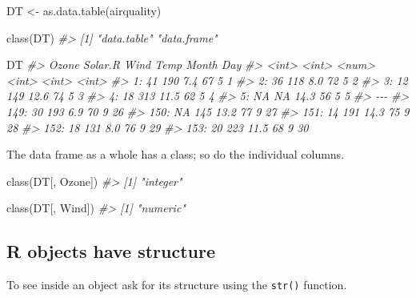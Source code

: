 \documentclass[
]{book}
\newenvironment{Shaded}{\begin{snugshade}}{\end{snugshade}}
\newcommand{\CommentTok}[1]{\textcolor[rgb]{0.56,0.35,0.01}{\textit{#1}}}
\newcommand{\FunctionTok}[1]{\textcolor[rgb]{0.00,0.00,0.00}{#1}}
\newcommand{\NormalTok}[1]{#1}
\newcommand{\OtherTok}[1]{\textcolor[rgb]{0.56,0.35,0.01}{#1}}
\begin{document}
\begin{Shaded}
\begin{Highlighting}[]
\NormalTok{DT }\OtherTok{\textless{}{-}} \FunctionTok{as.data.table}\NormalTok{(airquality)}

\FunctionTok{class}\NormalTok{(DT)}
\CommentTok{\#\textgreater{} [1] "data.table" "data.frame"}

\NormalTok{DT}
\CommentTok{\#\textgreater{}      Ozone Solar.R  Wind  Temp Month   Day}
\CommentTok{\#\textgreater{}      \textless{}int\textgreater{}   \textless{}int\textgreater{} \textless{}num\textgreater{} \textless{}int\textgreater{} \textless{}int\textgreater{} \textless{}int\textgreater{}}
\CommentTok{\#\textgreater{}   1:    41     190   7.4    67     5     1}
\CommentTok{\#\textgreater{}   2:    36     118   8.0    72     5     2}
\CommentTok{\#\textgreater{}   3:    12     149  12.6    74     5     3}
\CommentTok{\#\textgreater{}   4:    18     313  11.5    62     5     4}
\CommentTok{\#\textgreater{}   5:    NA      NA  14.3    56     5     5}
\CommentTok{\#\textgreater{}  {-}{-}{-}                                      }
\CommentTok{\#\textgreater{} 149:    30     193   6.9    70     9    26}
\CommentTok{\#\textgreater{} 150:    NA     145  13.2    77     9    27}
\CommentTok{\#\textgreater{} 151:    14     191  14.3    75     9    28}
\CommentTok{\#\textgreater{} 152:    18     131   8.0    76     9    29}
\CommentTok{\#\textgreater{} 153:    20     223  11.5    68     9    30}
\end{Highlighting}
\end{Shaded}

The data frame as a whole has a class; so do the individual columns.

\begin{Shaded}
\begin{Highlighting}[]
\FunctionTok{class}\NormalTok{(DT[, Ozone])}
\CommentTok{\#\textgreater{} [1] "integer"}

\FunctionTok{class}\NormalTok{(DT[, Wind])}
\CommentTok{\#\textgreater{} [1] "numeric"}
\end{Highlighting}
\end{Shaded}

\hypertarget{r-objects-have-structure}{%
\subsection{R objects have structure}\label{r-objects-have-structure}}

To see inside an object ask for its structure using the \texttt{str()} function.
\end{document}
